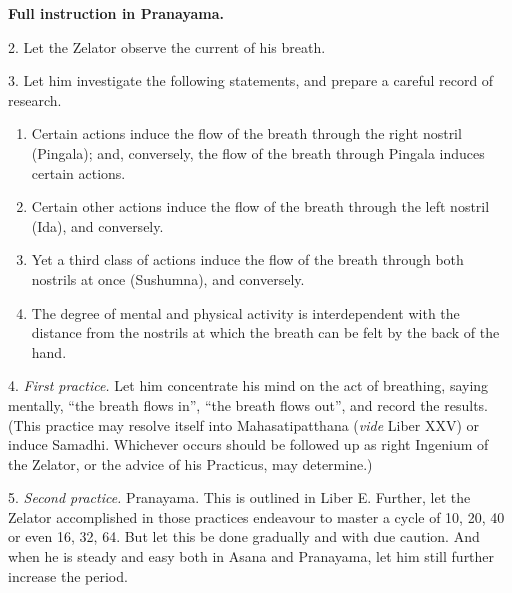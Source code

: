 
\textbf{Full instruction in Pranayama.} 

2. Let the Zelator observe the current of his breath.

3. Let him investigate the following statements, and prepare a careful record of research.

\begin{enumerate}[label=(\textit{\alph*})]
\item Certain actions induce the flow of the breath through the right nostril (Pingala); and, conversely, the flow of the breath through Pingala induces certain actions.
\item Certain other actions induce the flow of the breath through the left nostril (Ida), and conversely.
\item Yet a third class of actions induce the flow of the breath through both nostrils at once (Sushumna), and conversely.
\item The degree of mental and physical activity is interdependent with the distance from the nostrils at which the breath can be felt by the back of the hand.
\end{enumerate}

4. \textit{First practice.} Let him concentrate his mind on the act of breathing, saying mentally, \enquote{the breath flows in}, \enquote{the breath flows out}, and record the results. (This practice may resolve itself into Mahasatipatthana (\textit{vide} Liber XXV) or induce Samadhi. Whichever occurs should be followed up as right Ingenium of the Zelator, or the advice of his Practicus, may determine.)

5. \textit{Second practice.} Pranayama. This is outlined in Liber E. Further, let the Zelator accomplished in those practices endeavour to master a cycle of 10, 20, 40 or even 16, 32, 64. But let this be done gradually and with due caution. And when he is steady and easy both in Asana and Pranayama, let him still further increase the period.


